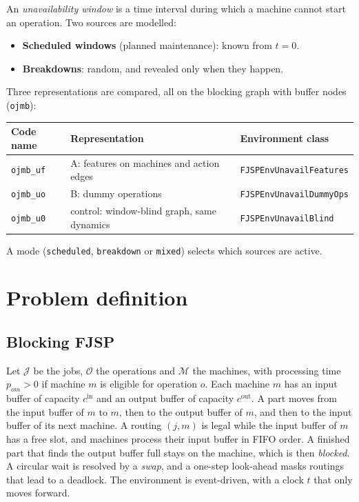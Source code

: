 \documentclass[11pt,a4paper]{article}
\newcommand{\Mset}{\mathcal{M}}
\newcommand{\Oset}{\mathcal{O}}
\newcommand{\Jset}{\mathcal{J}}
\newcommand{\cin}{c^{\mathrm{in}}}
\newcommand{\cout}{c^{\mathrm{out}}}
\newcommand{\code}[1]{\texttt{#1}}
\begin{document}
An \emph{unavailability window} is a time interval during which a machine cannot start an
operation. Two sources are modelled:
\begin{itemize}[nosep]
  \item \textbf{Scheduled windows} (planned maintenance): known from $t=0$.
  \item \textbf{Breakdowns}: random, and revealed only when they happen.
\end{itemize}
Three representations are compared, all on the blocking graph with buffer nodes (\code{ojmb}):
\begin{center}
\begin{tabular}{@{}lll@{}}
\toprule
Code name & Representation & Environment class \\
\midrule
\code{ojmb\_uf} & A: features on machines and action edges & \code{FJSPEnvUnavailFeatures} \\
\code{ojmb\_uo} & B: dummy operations & \code{FJSPEnvUnavailDummyOps} \\
\code{ojmb\_u0} & control: window-blind graph, same dynamics & \code{FJSPEnvUnavailBlind} \\
\bottomrule
\end{tabular}
\end{center}
A mode (\code{scheduled}, \code{breakdown} or \code{mixed}) selects which sources are active.

\section{Problem definition}

\subsection{Blocking FJSP}

Let $\Jset$ be the jobs, $\Oset$ the operations and $\Mset$ the machines, with processing time
$p_{om}>0$ if machine $m$ is eligible for operation $o$. Each machine $m$ has an input buffer of
capacity $\cin$ and an output buffer of capacity $\cout$. A part moves from the input buffer of
$m$ to $m$, then to the output buffer of $m$, and then to the input buffer of its next machine.
A routing $(j,m)$ is legal while the input buffer of $m$ has a free slot, and machines process
their input buffer in FIFO order. A finished part that finds the output buffer full stays on
the machine, which is then \emph{blocked}. A circular wait is resolved by a \emph{swap}, and a
one-step look-ahead masks routings that lead to a deadlock. The environment is event-driven,
with a clock $t$ that only moves forward.
\end{document}
